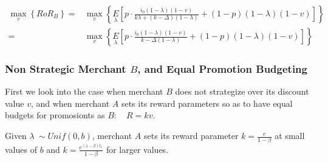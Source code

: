 \begin{align*}
\underset{v}\max\left\{RoR_B\right\} =& \underset{v}\max\left\{\underset{\lambda}E\left[p\cdot\frac{i_0(1-\lambda)(1-v)}{k\lambda + (k-\Delta)(1-\lambda)} + (1-p)(1-\lambda)(1-v)\right]\right\}\\
                                     =& \underset{v}\max\left\{\underset{\lambda}E\left[p\cdot\frac{i_0(1-\lambda)(1-v)}{k - \Delta(1-\lambda)} + (1-p)(1-\lambda)(1-v)\right]\right\}
\end{align*}

\subsubsection{Non Strategic Merchant $B$, and Equal Promotion Budgeting}
First we look into the case when merchant $B$ does not strategize over its discount value $v$, and when merchant $A$ sets its reward parameters so as to have equal budgets for promosionts as $B$: \ie~ $R = k v$.
\begin{theorem}
Given $\lambda~\sim Unif(0,b)$, merchant $A$ sets its reward parameter $k = \frac{e}{1-\beta}$ at small values of $b$ and $k = \frac{e^{(1-\beta)t_1}}{1-\beta}$ for larger values.
\end{theorem}
